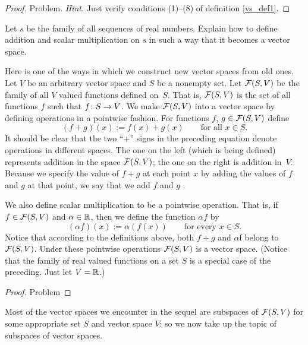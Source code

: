 \begin{proof} Problem. \emph{Hint.} Just verify conditions (1)--(8) of definition \ref{vs_def1}. \ns
\end{proof}

\begin{prob} Let
$s$ be the family of all sequences of real numbers.  Explain how to define addition and scalar
multiplication on $s$ in such a way that it becomes a vector space.
\end{prob}

\begin{exam}\label{vs_exam1} Here is one of the ways in which we construct new vector spaces
from old ones.  Let $V$ be an arbitrary vector space and $S$ be a nonempty set.  Let
$\mathcal{F}(S,V)$ be the family of all $V$ valued functions defined on~$S$.  That is, $\mathcal{F}(S,V)$ is the set of all functions $f$ such that $f\colon S \rightarrow V$.  We make $\mathcal{F}(S,V)$
into a vector space by defining operations in a pointwise fashion.  For functions $f$, $g \in
\mathcal{F}(S,V)$ define
 \[ (f + g)(x) := f(x) + g(x) \qquad\text{for all $x \in S$}. \]
It should be clear that the two ``+'' signs in the preceding equation denote operations in
different spaces.  The one on the left (which is being defined) represents addition in the
space $\mathcal{F}(S,V)$; the one on the right is addition in~$V$.  Because we specify the value of
$f + g$ at each point $x$ by adding the values of $f$ and $g$ at that point, we say that we
add $f$ and $g$
.

We also define scalar multiplication to be a pointwise operation. That is, if $f \in \mathcal{F}(S,V)$ and $\alpha \in \mathbb{R}$, then we define the function $\alpha f$ by
 \[ (\alpha f)(x) := \alpha(f(x)) \qquad\text{for every $x \in S$}. \]
Notice that according to the definitions above, both $f + g$ and $\alpha $f belong to $\mathcal{F}(S,V)$.  Under these pointwise operations $\mathcal{F}(S,V)$ is a vector space.  (Notice that the
family of real valued functions on a set $S$ is a special case of the preceding. Just let $V =
\mathbb{R}$.)
\end{exam}

\begin{proof} Problem  \ns  \end{proof}

Most of the vector spaces we encounter in the sequel are subspaces of $\mathcal{F}(S,V)$ for some
appropriate set $S$ and vector space $V$: so we now take up the topic of subspaces of vector
spaces.

